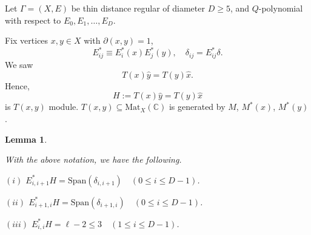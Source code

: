 \documentclass[
]{book}
\newtheorem{lemma}{Lemma}[chapter]
\theoremstyle{definition}
\theoremstyle{definition}
\theoremstyle{definition}
\theoremstyle{definition}
\theoremstyle{remark}
\begin{document}
Let \(\Gamma = (X, E)\) be thin distance regular of diameter \(D\geq 5\), and \(Q\)-polynomial with respect to \(E_0, E_1, \ldots, E_D\).

Fix vertices \(x,y\in X\) with \(\partial(x,y) = 1\),
\[E^*_{ij} \equiv E^*_i(x)E^*_j(y), \quad \delta_{ij} = E^*_{ij}\delta.\]
We saw
\[T(x)\hat{y} = T(y)\hat{x}.\]
Hence,
\[H := T(x)\hat{y} = T(y)\hat{x}\]
is \(T(x,y)\) module.
\(T(x,y) \subseteq \mathrm{Mat}_X(\mathbb{C})\) is generated by \(M\), \(M^*(x)\), \(M^*(y)\).

\begin{lemma}
\protect\hypertarget{lem:h}{}\label{lem:h}

With the above notation, we have the following.

\((i)\) \(E^*_{i,i+1}H = \mathrm{Span}(\delta_{i,i+1}) \quad (0\leq i\leq D-1)\).

\((ii)\) \(E^*_{i+1,i}H = \mathrm{Span}(\delta_{i+1,i}) \quad (0\leq i\leq D-1)\).

\((iii)\) \(E^*_{i,i}H = \ell-2 \leq 3 \quad (1\leq i\leq D-1)\).

\end{lemma}
\end{document}
